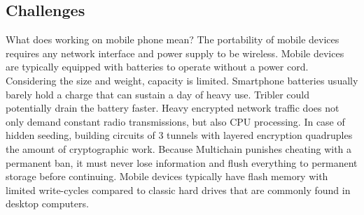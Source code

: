 \subsection{Challenges}
What does working on mobile phone mean?
The portability of mobile devices requires any network interface and power supply to be wireless.
Mobile devices are typically equipped with batteries to operate without a power cord.
Considering the size and weight, capacity is limited.
Smartphone batteries usually barely hold a charge that can sustain a day of heavy use.
Tribler could potentially drain the battery faster.
Heavy encrypted network traffic does not only demand constant radio transmissions, but also CPU processing.
In case of hidden seeding, building circuits of 3 tunnels with layered encryption quadruples  the amount of cryptographic work.
Because Multichain punishes cheating with a permanent ban, it must never lose information and flush everything to permanent storage before continuing.
Mobile devices typically have flash memory with limited write-cycles compared to classic hard drives that are commonly found in desktop computers.

